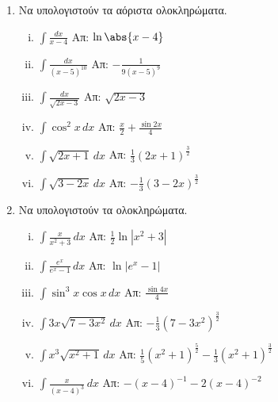 


\everymath{\displaystyle}



\thispagestyle{empty}
\begin{center}
\end{center}
\vspace{\baselineskip}
\begin{enumerate}

\item Να υπολογιστούν τα αόριστα ολοκληρώματα.


\begin{enumerate}[i)]
    \item $ \int \frac{dx}{x-4}$ \hfill Απ: $ \ln{\abs{x-4}} $ 
    \item $\int\frac{dx}{(x-5)^{10}} $ \hfill Απ: $-\frac{1}{9(x-5)^9}$
    \item $ \int\frac{dx}{\sqrt{2x-3}}$ \hfill Απ: $ \sqrt{2x-3} $
    \item $\int\cos^2x \, dx$ \hfill Απ: $\frac{x}{2} + \frac{\sin2x}{4}$
    \item $ \int \sqrt{ 2x+1 } \,{dx} $ \hfill Απ: 
        $ \frac{ 1 }{ 3 } (2x+1)^{\frac{ 3 }{ 2 } } $
    \item $ \int \sqrt{ 3-2x } \,{dx} $ \hfill Απ: 
        $ - \frac{ 1}{ 3 }(3-2x)^{\frac{ 3 }{ 2 }}  $
\end{enumerate}


\item Να υπολογιστούν τα ολοκληρώματα.

\begin{enumerate}[i)]
    \item $\int\frac{x}{x^2+3} \, dx$ \hfill Απ: $\frac{1}{2}\ln|x^2+3|$
    \item $\int \frac{e^x}{e^x-1} \, dx$ \hfill Απ: $\ln|e^x-1|$
    \item $\int \sin^3x\cos x \, dx$ \hfill Απ: $\frac{\sin4x}{4}$
    \item $ \int 3x \sqrt{ 7-3x^{2} } \,{dx} $ \hfill Απ: 
        $ - \frac{1}{ 3 } (7-3x^{2})^{\frac{ 3 }{ 2 }} $
    \item $ \int x^{3} \sqrt{ x^{2} +1}  \,{dx} $ \hfill Απ: 
        $ \frac{ 1 }{ 5 } (x^{2}+1)^{\frac{ 5 }{ 2 }} - 
        \frac{1}{ 3 } (x^{2} + 1)^{\frac{ 3 }{ 2 }}  $
    \item $ \int \frac{ x }{ (x-4)^{3} } \,{dx} $ \hfill Απ: $ -(x-4)^{-1} - 2(x-4)^{-2} $
\end{enumerate}



\end{enumerate}








